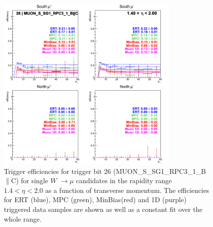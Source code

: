 \begin{figure}[h!]

  \centering

  \includegraphics[width=0.8\textwidth]{./figures/run13_trigeffipt_eta1_trig26_lin.png}
  \caption{\label{fig:run13_trigeffipt_eta1_nper0_trig26_lin} Trigger efficiencies for trigger bit 26 (MUON\_S\_SG1\_RPC3\_1\_B$\|$C) for single $W$ $\rightarrow \mu$ candidates in the rapidity range $ 1.4 < \eta < 2.0$ as a function of transverse momentum. The efficiencies for ERT (blue), MPC (green), MinBias(red) and 1D (purple) triggered data samples are shown as well as a constant fit over the whole range.}

\end{figure}
\clearpage
